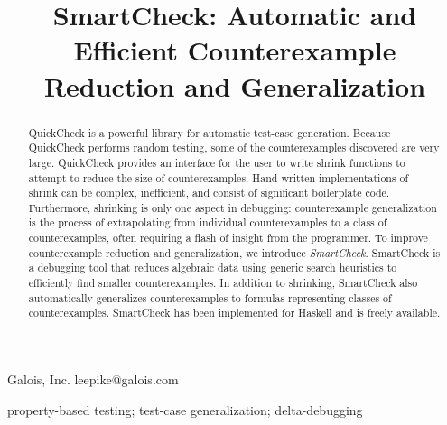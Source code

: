 \documentclass{sigplanconf}
\begin{document}
\newcommand{\xmonad}{\textsc{xmonad}\xspace}

\exclusivelicense
{}


\title{SmartCheck: Automatic and Efficient Counterexample Reduction and Generalization}

           {Galois, Inc.}
           {leepike@galois.com}
\maketitle

\begin{abstract}
QuickCheck is a powerful library for automatic test-case generation.  Because QuickCheck performs random testing, some of the counterexamples discovered are very large.  QuickCheck provides an interface for the user to write shrink functions to attempt to reduce the size of counterexamples.  Hand-written implementations of shrink can be complex, inefficient, and consist of significant boilerplate code.  Furthermore, shrinking is only one aspect in debugging: counterexample generalization is the process of extrapolating from individual counterexamples to a class of counterexamples, often requiring a flash of insight from the programmer.  To improve counterexample reduction and generalization, we introduce \emph{SmartCheck}.  SmartCheck is a debugging tool that reduces algebraic data using generic search heuristics to efficiently find smaller counterexamples.  In addition to shrinking, SmartCheck also automatically generalizes counterexamples to formulas representing classes of counterexamples.  SmartCheck has been implemented for Haskell and is freely available.
\end{abstract}



\keywords
property-based testing; test-case generalization; delta-debugging
\end{document}
